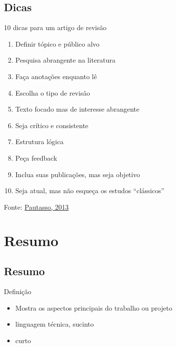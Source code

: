 \documentclass{beamer}
\begin{document}
\subsection{Dicas}

\begin{frame}{10 dicas para um artigo de revisão}
  \begin{enumerate}
    \scriptsize
  \item Definir tópico e público alvo
    \smallskip
  \item Pesquisa abrangente na literatura
    \smallskip
  \item Faça anotações enquanto lê
    \smallskip
  \item Escolha o tipo de revisão
    \smallskip
  \item Texto focado mas de interesse abrangente
    \smallskip
  \item Seja crítico e consistente
    \smallskip
  \item Estrutura lógica
    \smallskip
  \item Peça feedback
    \smallskip
  \item Inclua suas publicações, mas seja objetivo
    \smallskip
  \item Seja atual, mas não esqueça os estudos ``clássicos''
  \end{enumerate}

  \vfill
  \scriptsize
  \hfill Fonte: \href{https://doi.org/10.1371/journal.pcbi.1003149}{Pautasso, 2013}
\end{frame}

\section{Resumo}

\subsection{Resumo}

\begin{frame}{Definição}
  \begin{itemize}
    \footnotesize
  \item Mostra os aspectos principais do trabalho ou projeto
    \bigskip
  \item linguagem técnica, sucinto
    \bigskip
  \item curto
  \end{itemize}
\end{frame}
\end{document}
